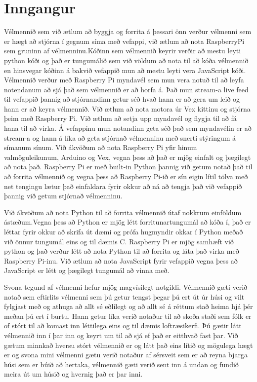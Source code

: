 \section{Inngangur}
Vélmennið sem við ætlum að byggja og forrita á þessari önn verður vélmenni sem er hægt að stjórna í gegnum síma með vefappi, við ætlum að nota RaspberryPi sem gruninn af vélmenninu.Kóðinn sem vélmennið keyrir verðir að mestu leyti python kóði og það er tungumálið sem við völdum að nota til að kóða vélmennið en hinsvegar kóðinn á bakvið vefappið mun að mestu leyti vera JavaScript kóði. Vélmennið verður með Raspberry Pi myndavél sem mun vera notuð til að leyfa notendanum að sjá það sem vélmennið er að horfa á. Það mun stream-a live feed til vefappið þannig að stjórnandinn getur séð hvað hann er að gera um leið og hann er að keyra vélmennið. Við ætlum að nota motora úr Vex kittinu og stjórna þeim með Raspberry Pi. Við ætlum að setja upp myndavél og flygja \cite{prasad2014smart} til að fá hana til að virka. Á vefappinu mun notandinn geta séð það sem myndavélin er að stream-a og hann á líka að geta stjórnað vélmenninu með snerti stýringum á símanum sínum. Við ákvöðum að nota Raspberry Pi yfir hinum valmöguleikunum, Arduino og Vex, vegna þess að það er mjög einfalt og þægilegt að nota það. Raspberry Pi er með built-in Python þannig við getum notað það til að forrita vélmennið og vegna þess að Raspberry Pi-ið er sín eigin lítil tölva með net tengingu lætur það einfaldara fyrir okkur að ná að tengja það við vefappið þannig við getum stjórnað vélmenninu.

Við ákvöðum að nota Python til að forrita vélmennið útaf nokkrum einföldum ástæðum.Vegna þess að Python er mjög létt forritunartungumál að kóða í, það er léttar fyrir okkur að skrifa út dæmi og prófa hugmyndir okkar í Python meðað við önnur tungumál eins og til dæmis C. Raspberry Pi er mjög samhæft við python og það verður létt að nota Python til að forrita og láta það virka með Raspberry Pi-inu. Við ætlum að nota JavaScript fyrir vefappið vegna þess að JavaScript er létt og þægilegt tungumál að vinna með.

Svona tegund af vélmenni hefur mjög magvísilegt notgildi. Vélmennið gæti verið notað sem eftirlits vélmenni sem þú getur tengst þegar þú ert út úr húsi og vilt fylgjast með og athuga að allt sé eðlilegt og að allt sé á réttum stað heima hjá þér meðan þú ert í burtu. Hann getur líka verið notaður til að skoða staði sem fólk er of stórt til að komast inn léttilega eins og til dæmis loftræsikerfi. Þú gætir látt vélmennið inn í þar inn og keyrt um til að sjá ef það er eitthvað fast þar. Við gætum minnkað hversu stórt vélmennið er og látt það eins lítið og mögulega hægt er og svona mini vélmenni gætu verið notaður af sérsveit sem er að reyna bjarga húsi sem er búið að hertaka, vélmennið gæti verið sent inn á undan og fundið meira út um húsið og hvernig það er þar inni. 

